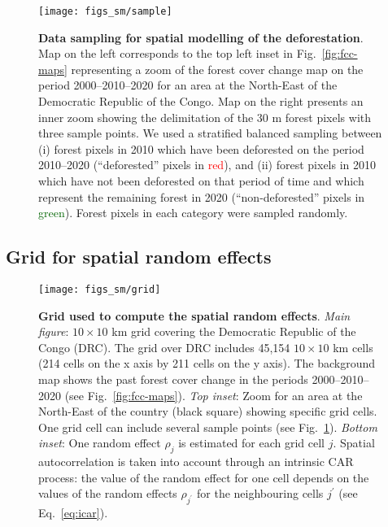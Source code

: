 \documentclass[
  12pt,
]{article}
\begin{document}
\begin{figure}[H]

{\centering \texttt{[image: figs\_sm/sample]} 

}

\caption{\textbf{Data sampling for spatial modelling of the deforestation}. Map on the left corresponds to the top left inset in Fig.~\ref{fig:fcc-maps} representing a zoom of the forest cover change map on the period 2000--2010--2020 for an area at the North-East of the Democratic Republic of the Congo. Map on the right presents an inner zoom showing the delimitation of the 30 m forest pixels with three sample points. We used a stratified balanced sampling between (i) forest pixels in 2010 which have been deforested on the period 2010--2020 (``deforested'' pixels in \textcolor{red}{red}), and (ii) forest pixels in 2010 which have not been deforested on that period of time and which represent the remaining forest in 2020 (``non-deforested'' pixels in \textcolor{darkgreen}{green}). Forest pixels in each category were sampled randomly.}\label{fig:sampling}
\end{figure}

\hypertarget{grid-for-spatial-random-effects}{%
\subsection{Grid for spatial random effects}\label{grid-for-spatial-random-effects}}



\begin{figure}[H]

{\centering \texttt{[image: figs\_sm/grid]} 

}

\caption{\textbf{Grid used to compute the spatial random effects}. \emph{Main figure}: \(10 \times 10\) km grid covering the Democratic Republic of the Congo (DRC). The grid over DRC includes 45,154 \(10 \times 10\) km cells (214 cells on the x axis by 211 cells on the y axis). The background map shows the past forest cover change in the periods 2000--2010--2020 (see Fig.~\ref{fig:fcc-maps}). \emph{Top inset}: Zoom for an area at the North-East of the country (black square) showing specific grid cells. One grid cell can include several sample points (see Fig.~\ref{fig:sampling}). \emph{Bottom inset}: One random effect \(\rho_j\) is estimated for each grid cell \(j\). Spatial autocorrelation is taken into account through an intrinsic CAR process: the value of the random effect for one cell depends on the values of the random effects \(\rho_{j^{\prime}}\) for the neighbouring cells \(j^{\prime}\) (see Eq.~\eqref{eq:icar}).}\label{fig:grid}
\end{figure}
\end{document}
